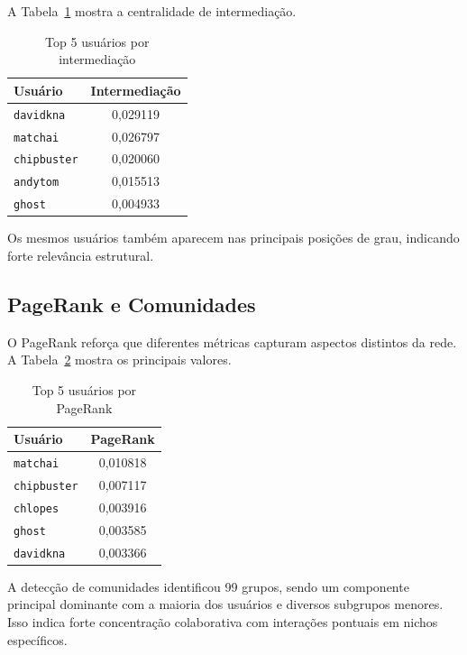 \documentclass[12pt]{article}
\begin{document}
A Tabela~\ref{tab:betweenness} mostra a centralidade de intermediação.

\begin{table}[H]
\centering
\caption{Top 5 usuários por intermediação}
\label{tab:betweenness}
\begin{tabular}{|l|c|}
\hline
\textbf{Usuário} & \textbf{Intermediação} \\ \hline
\texttt{davidkna} & 0,029119 \\ \hline
\texttt{matchai} & 0,026797 \\ \hline
\texttt{chipbuster} & 0,020060 \\ \hline
\texttt{andytom} & 0,015513 \\ \hline
\texttt{ghost} & 0,004933 \\ \hline
\end{tabular}
\end{table}

Os mesmos usuários também aparecem nas principais posições de grau, indicando forte relevância estrutural.

\subsection{PageRank e Comunidades}

O PageRank reforça que diferentes métricas capturam aspectos distintos da rede. A Tabela~\ref{tab:pagerank} mostra os principais valores.

\begin{table}[H]
\centering
\caption{Top 5 usuários por PageRank}
\label{tab:pagerank}
\begin{tabular}{|l|c|}
\hline
\textbf{Usuário} & \textbf{PageRank} \\ \hline
\texttt{matchai} & 0,010818 \\ \hline
\texttt{chipbuster} & 0,007117 \\ \hline
\texttt{chlopes} & 0,003916 \\ \hline
\texttt{ghost} & 0,003585 \\ \hline
\texttt{davidkna} & 0,003366 \\ \hline
\end{tabular}
\end{table}

A detecção de comunidades identificou 99 grupos, sendo um componente principal dominante com a maioria dos usuários e diversos subgrupos menores. Isso indica forte concentração colaborativa com interações pontuais em nichos específicos.
\end{document}

